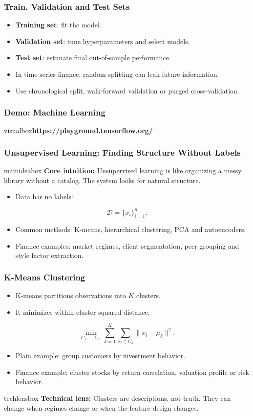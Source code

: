 \documentclass[aspectratio=169,12pt]{beamer}
\newcommand{\currentframetitle}{}
\newcommand{\slideTitle}[1]{\gdef\currentframetitle{#1}\frametitle{#1}}
\newcommand{\keyterm}[1]{\textbf{#1}}
\newcommand{\mainidea}[1]{%
  \vspace{0.08cm}
  \begin{beamercolorbox}[wd=\linewidth,rounded=true,sep=0.18cm]{mainideabox}
    \small\textbf{Core intuition:} #1
  \end{beamercolorbox}%
}
\newcommand{\techlens}[1]{%
  \vspace{0.08cm}
  \begin{beamercolorbox}[wd=\linewidth,rounded=true,sep=0.18cm]{techlensbox}
    \small\textbf{Technical lens:} #1
  \end{beamercolorbox}%
}
\begin{document}
\begin{frame}
\slideTitle{Train, Validation and Test Sets}
\begin{itemize}
  \item \keyterm{Training set}: fit the model.
  \item \keyterm{Validation set}: tune hyperparameters and select models.
  \item \keyterm{Test set}: estimate final out-of-sample performance.
  \item In time-series finance, random splitting can leak future information.
  \item Use chronological split, walk-forward validation or purged cross-validation.
\end{itemize}
\end{frame}


\begin{frame}
\slideTitle{Demo: Machine Learning}
\footnotesize
\begin{beamercolorbox}[wd=\linewidth,rounded=true,sep=0.12cm]{visualbox}\scriptsize\textbf{https://playground.tensorflow.org/} \end{beamercolorbox}
\centering
\end{frame}




\begin{frame}
\slideTitle{Unsupervised Learning: Finding Structure Without Labels}
\mainidea{Unsupervised learning is like organizing a messy library without a catalog. The system looks for natural structure.}
\begin{itemize}
  \item Data has no labels:
\end{itemize}
\[
\mathcal{D}=\{x_i\}_{i=1}^{n}.
\]
\begin{itemize}
  \item Common methods: K-means, hierarchical clustering, PCA and autoencoders.
  \item Finance examples: market regimes, client segmentation, peer grouping and style factor extraction.
\end{itemize}
\end{frame}

\begin{frame}
\slideTitle{K-Means Clustering}
\begin{itemize}
  \item K-means partitions observations into $K$ clusters.
  \item It minimizes within-cluster squared distance:
\end{itemize}
\[
\min_{C_1,\ldots,C_K}\sum_{k=1}^K \sum_{x_i\in C_k} \|x_i-\mu_k\|^2.
\]
\begin{itemize}
  \item Plain example: group customers by investment behavior.
  \item Finance example: cluster stocks by return correlation, valuation profile or risk behavior.
\end{itemize}
\techlens{Clusters are descriptions, not truth. They can change when regimes change or when the feature design changes.}
\end{frame}
\end{document}
